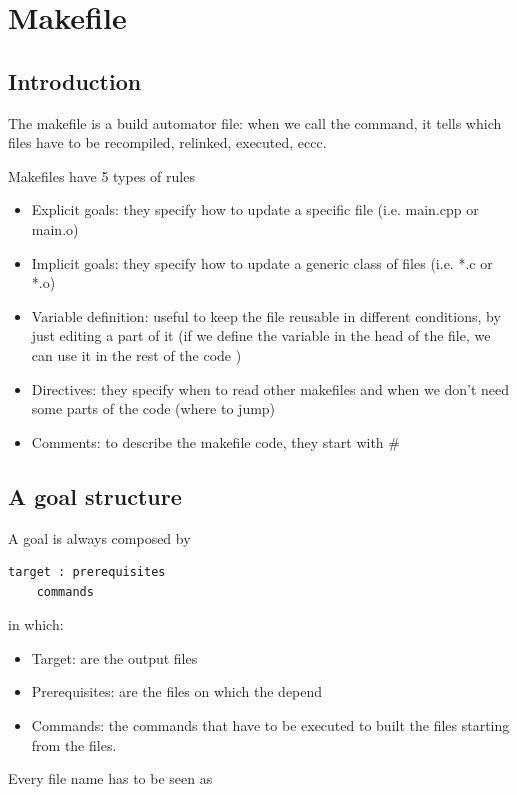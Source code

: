 \pagebreak

\section{Makefile}
\subsection{Introduction}
The makefile is a build automator file: when we call the  command, it tells which files have to be recompiled, relinked, executed, eccc.

Makefiles have 5 types of rules
\begin{itemize}
	\item Explicit goals: they specify how to update a specific file (i.e. main.cpp or main.o)
	\item Implicit goals: they specify how to update a generic class of files (i.e. *.c or *.o)
	\item Variable definition: useful to keep the file reusable in different conditions, by just editing a part of it (if we define the variable  in the head of the file, we can use it in the rest of the code )
	\item Directives: they specify when to read other makefiles and when we don't need some parts of the code (where to jump)
	\item Comments: to describe the makefile code, they start with \#%
\end{itemize}

\subsection{A goal structure}
A goal is always composed by
\begin{lstlisting}
target : prerequisites
	commands
\end{lstlisting}
in which:
\begin{itemize}
\item Target: are the output files	
\item Prerequisites: are the files on which the  depend
\item Commands: the commands that have to be executed to built the  files starting from the  files.
\end{itemize}

Every file name has to be seen as

